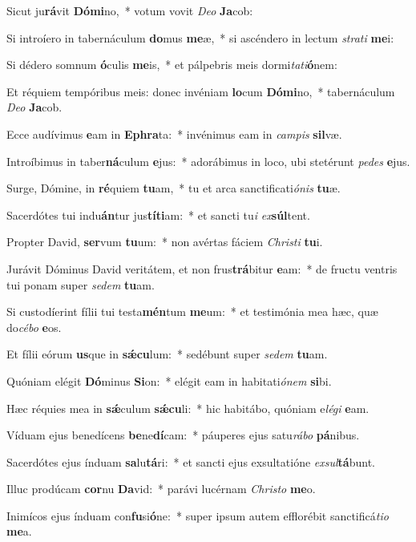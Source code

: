 \item Sicut ju\textbf{rá}vit \textbf{Dó}\textbf{mi}no,~* votum vovit \textit{De}\textit{o} \textbf{Ja}cob:
\item Si introíero in tabernáculum \textbf{do}mus \textbf{me}æ,~* si ascéndero in lectum \textit{stra}\textit{ti} \textbf{me}i:
\item Si dédero somnum \textbf{ó}culis \textbf{me}is,~* et pálpebris meis dormi\textit{ta}\textit{ti}\textbf{ó}nem:
\item Et réquiem tempóribus meis: donec invéniam \textbf{lo}cum \textbf{Dó}\textbf{mi}no,~* tabernáculum \textit{De}\textit{o} \textbf{Ja}cob.
\item Ecce audívimus \textbf{e}am in \textbf{E}\textbf{phra}ta:~* invénimus eam in \textit{cam}\textit{pis} \textbf{sil}væ.
\item Introíbimus in taber\textbf{ná}culum \textbf{e}jus:~* adorábimus in loco, ubi stetérunt \textit{pe}\textit{des} \textbf{e}jus.
\item Surge, Dómine, in \textbf{ré}quiem \textbf{tu}am,~* tu et arca sanctificati\textit{ó}\textit{nis} \textbf{tu}æ.
\item Sacerdótes tui indu\textbf{án}tur jus\textbf{tí}\textbf{ti}am:~* et sancti tu\textit{i} \textit{ex}\textbf{súl}tent.
\item Propter David, \textbf{ser}vum \textbf{tu}um:~* non avértas fáciem \textit{Chris}\textit{ti} \textbf{tu}i.
\item Jurávit Dóminus David veritátem, et non frus\textbf{trá}bitur \textbf{e}am:~* de fructu ventris tui ponam super \textit{se}\textit{dem} \textbf{tu}am.
\item Si custodíerint fílii tui testa\textbf{mén}tum \textbf{me}um:~* et testimónia mea hæc, quæ do\textit{cé}\textit{bo} \textbf{e}os.
\item Et fílii eórum \textbf{us}que in \textbf{sǽ}\textbf{cu}lum:~* sedébunt super \textit{se}\textit{dem} \textbf{tu}am.
\item Quóniam elégit \textbf{Dó}minus \textbf{Si}on:~* elégit eam in habitati\textit{ó}\textit{nem} \textbf{si}bi.
\item Hæc réquies mea in \textbf{sǽ}culum \textbf{sǽ}\textbf{cu}li:~* hic habitábo, quóniam e\textit{lé}\textit{gi} \textbf{e}am.
\item Víduam ejus benedícens \textbf{be}ne\textbf{dí}cam:~* páuperes ejus satu\textit{rá}\textit{bo} \textbf{pá}nibus.
\item Sacerdótes ejus índuam \textbf{sa}lu\textbf{tá}ri:~* et sancti ejus exsultatióne \textit{ex}\textit{sul}\textbf{tá}bunt.
\item Illuc prodúcam \textbf{cor}nu \textbf{Da}vid:~* parávi lucérnam \textit{Chris}\textit{to} \textbf{me}o.
\item Inimícos ejus índuam con\textbf{fu}si\textbf{ó}ne:~* super ipsum autem efflorébit sanctificá\textit{ti}\textit{o} \textbf{me}a.
